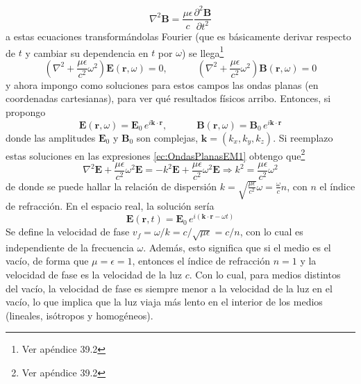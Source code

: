 \begin{equation*}
    \nabla^{2}\textbf{B} 
    = \frac{\mu\epsilon}{c}\frac{\partial^{2}\textbf{B}}{\partial t^{2}}
\end{equation*}
a estas ecuaciones transformándolas Fourier (que es básicamente derivar respecto de $t$ y cambiar su dependencia en $t$ por $\omega$) se llega\footnote{Ver apéndice 39.2}
\begin{equation}
    \left(
        \nabla^{2} + \frac{\mu \epsilon}{c^{2}}\omega^{2}
    \right)
    \textbf{E}(\textbf{r}, \omega) 
    = 0,
    \quad
    \quad
    \quad
    \left(
        \nabla^{2} + \frac{\mu \epsilon}{c^{2}}\omega^{2}
    \right)
    \textbf{B}(\textbf{r}, \omega) 
    = 0
        \label{ec:OndasPlanasEM1}
\end{equation}
y ahora impongo como soluciones para estos campos las ondas planas (en coordenadas cartesianas), para ver qué resultados físicos arribo. Entonces, si propongo
\begin{equation*}
    \textbf{E}(\textbf{r},\omega) = \textbf{E}_{0}\,e^{i \textbf{k}\cdot \textbf{r}},
    \quad
    \quad
    \quad
    \textbf{B}(\textbf{r},\omega) = \textbf{B}_{0}\,e^{i \textbf{k}\cdot \textbf{r}}
\end{equation*}
donde las amplitudes $\textbf{E}_{0}$ y $\textbf{B}_{0}$ son complejas, $\textbf{k} = (k_{x}, k_{y}, k_{z})$. Si reemplazo estas soluciones en las expresiones \eqref{ec:OndasPlanasEM1} obtengo que\footnote{Ver apéndice 39.2}
\begin{equation*}
    \nabla^{2} \textbf{E} + \frac{\mu\epsilon}{c^{2}}\omega^{2}\textbf{E} = 
    -k^{2} \textbf{E} + \frac{\mu\epsilon}{c^{2}}\omega^{2}\textbf{E} 
    \Longrightarrow k^{2} = \frac{\mu \epsilon}{c^{2}}\omega^{2}
\end{equation*}
de donde se puede hallar la relación de dispersión $k = \sqrt{\frac{\mu \epsilon}{c^{2}}}\omega = \frac{\omega}{c}n$, con $n$ el índice de refracción. En el espacio real, la solución sería
\begin{equation*}
    \textbf{E}(\textbf{r},t) = \textbf{E}_{0}\,e^{i(\textbf{k}\cdot \textbf{r} - \omega t)}
\end{equation*}
Se define la velocidad de fase $v_{f} = \omega/k = c/\sqrt{\mu \epsilon} = c/n$, con lo cual es independiente de la frecuencia $\omega$. Además, esto significa que si el medio es el vacío, de forma que $\mu = \epsilon = 1$, entonces el índice de refracción $n = 1$ y la velocidad de fase es la velocidad de la luz $c$. Con lo cual, para medios distintos del vacío, la velocidad de fase es siempre menor a la velocidad de la luz en el vacío, lo que implica que la luz viaja más lento en el interior de los medios (lineales, isótropos y homogéneos).\\
